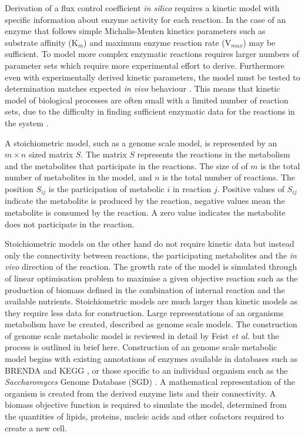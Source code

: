Derivation of a flux control coefficient \emph{in silico} requires a kinetic model with specific information about enzyme activity for each reaction. In the case of an enzyme that follows simple Michalis-Menten kinetics parameters such as substrate affinity (K$_{m}$) and maximum enzyme reaction rate (V$_{max}$) may be sufficient. To model more complex enzymatic reactions requires larger numbers of parameter sets which require more experimental effort to derive. Furthermore even with experimentally derived kinetic parameters, the model must be tested to determination matches expected \emph{in vivo} behaviour \cite{teusink2000}. This means that kinetic model of biological processes are often small with a limited number of reaction sets, due to the difficulty in finding sufficient enzymatic data for the reactions in the system \cite{steuer2007}.


A stoichiometric model, such as a genome scale model, is represented by an $m \times n$ sized matrix $S$. The matrix $S$ represents the reactions in the metabolism and the metabolites that participate in the reactions. The size of of $m$ is the total number of metabolites in the model, and $n$ is the total number of reactions. The position $S_{ij}$ is the participation of metabolic $i$ in reaction $j$. Positive values of $S_{ij}$ indicate the metabolite is produced by the reaction, negative values mean the metabolite is consumed by the reaction. A zero value indicates the metabolite does not participate in the reaction.

Stoichiometric models on the other hand do not require kinetic data but instead only the connectivity between reactions, the participating metabolites and the \emph{in vivo} direction of the reaction. The growth rate of the model is simulated through of linear optimisation problem to maximise a given objective reaction such as the production of biomass defined in the combination of internal reaction and the available nutrients. Stoichiometric models are much larger than kinetic models as they require less data for construction. Large representations of an organisms metabolism have be created, described as genome scale models. The construction of genome scale metabolic model is reviewed in detail by Feist \emph{et al.} \cite{feist2009} but the process is outlined in brief here. Construction of an genome scale metabolic model begins with existing annotations of enzymes available in databases such as BRENDA \cite{chang2009} and KEGG \cite{okuda2008}, or those specific to an individual organism such as the \emph{Saccharomyces} Genome Database (SGD) \cite{cherry1997}. A mathematical representation of the organism is created from the derived enzyme lists and their connectivity. A biomass objective function is required to simulate the model, determined from the quantities of lipids, proteins, nucleic acids and other cofactors required to create a new cell.


